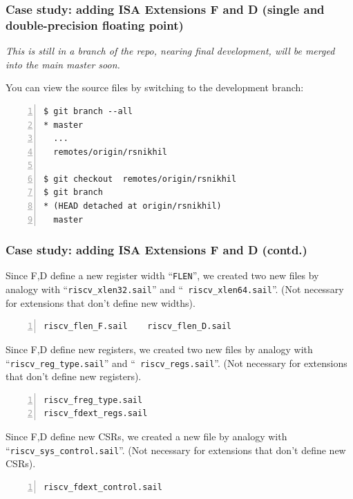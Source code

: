\documentclass[aspectratio=169]{beamer}
\newcommand{\slidefont}{\scriptsize}
\begin{document}
\begin{frame}[fragile]
  \frametitle{Case study: adding ISA Extensions F and D (single and double-precision floating point)}

  \slidefont

  \emph{This is still in a branch of the repo, nearing final development, will be merged into the main master soon.}

  You can view the source files by switching to the development branch:

  \vspace{1ex}

  \begin{Verbatim}[frame=single, numbers=left, label = In your riscv-compliance repository clone]
$ git branch --all
* master
  ...
  remotes/origin/rsnikhil

$ git checkout  remotes/origin/rsnikhil
$ git branch
* (HEAD detached at origin/rsnikhil)
  master
  \end{Verbatim}

\end{frame}


\begin{frame}[fragile]
  \frametitle{Case study: adding ISA Extensions F and D (contd.)}

  \slidefont

  Since F,D define a new register width ``{\tt FLEN}'', we created two new files
  by analogy with ``{\tt riscv\_xlen32.sail}'' and ``{\tt
    riscv\_xlen64.sail}''.  (Not necessary for extensions that don't define new widths).

  \vspace{1ex}

  \begin{Verbatim}[frame=single, numbers=left, label = In sail-riscv/model]
riscv_flen_F.sail    riscv_flen_D.sail
  \end{Verbatim}

  Since F,D define new registers, we created two new files
  by analogy with ``{\tt riscv\_reg\_type.sail}'' and ``{\tt
    riscv\_regs.sail}''.  (Not necessary for extensions that don't define new registers).

  \vspace{1ex}

  \begin{Verbatim}[frame=single, numbers=left, label = In sail-riscv/model]
riscv_freg_type.sail
riscv_fdext_regs.sail
  \end{Verbatim}

  Since F,D define new CSRs, we created a new file
  by analogy with ``{\tt riscv\_sys\_control.sail}''.  (Not necessary for extensions that don't define new CSRs).

  \vspace{1ex}

  \begin{Verbatim}[frame=single, numbers=left, label = In sail-riscv/model]
riscv_fdext_control.sail
  \end{Verbatim}

\end{frame}
\end{document}
